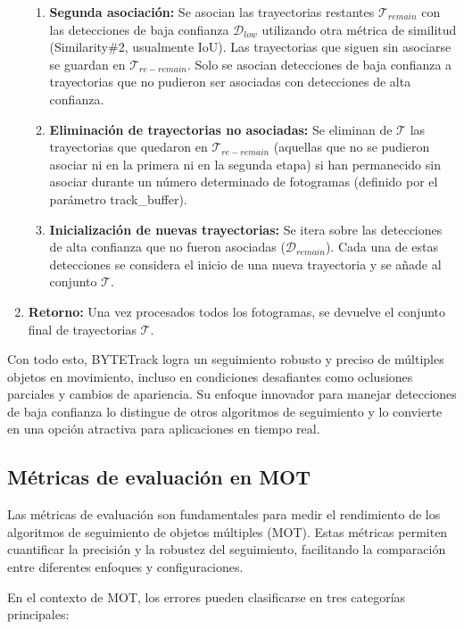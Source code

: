 \documentclass[11pt,spanish,listoffigures,listoftables]{tfgetsinf}
\begin{document}
\begin{enumerate}
{\begin{enumerate}
      \item \textbf{Segunda asociación:} Se asocian las trayectorias restantes $\mathcal{T}_{remain}$ con las detecciones de baja confianza $\mathcal{D}_{low}$ utilizando otra métrica de similitud (Similarity\#2, usualmente IoU). Las trayectorias que siguen sin asociarse se guardan en $\mathcal{T}_{re-remain}$. Solo se asocian detecciones de baja confianza a trayectorias que no pudieron ser asociadas con detecciones de alta confianza.
      \item \textbf{Eliminación de trayectorias no asociadas:} Se eliminan de $\mathcal{T}$ las trayectorias que quedaron en $\mathcal{T}_{re-remain}$ (aquellas que no se pudieron asociar ni en la primera ni en la segunda etapa) si han permanecido sin asociar durante un número determinado de fotogramas (definido por el parámetro track\_buffer).
      \item \textbf{Inicialización de nuevas trayectorias:} Se itera sobre las detecciones de alta confianza que no fueron asociadas ($\mathcal{D}_{remain}$). Cada una de estas detecciones se considera el inicio de una nueva trayectoria y se añade al conjunto $\mathcal{T}$.
   \end{enumerate}
   } %
   \item \textbf{Retorno:} Una vez procesados todos los fotogramas, se devuelve el conjunto final de trayectorias $\mathcal{T}$.
\end{enumerate}


Con todo esto, BYTETrack logra un seguimiento robusto y preciso de múltiples objetos en movimiento, incluso en condiciones desafiantes como oclusiones parciales y cambios de apariencia. Su enfoque innovador para manejar detecciones de baja confianza lo distingue de otros algoritmos de seguimiento y lo convierte en una opción atractiva para aplicaciones en tiempo real.


\subsection{Métricas de evaluación en MOT} \label{sec:metricas_mot}

Las métricas de evaluación son fundamentales para medir el rendimiento de los algoritmos de seguimiento de objetos múltiples (MOT). Estas métricas permiten cuantificar la precisión y la robustez del seguimiento, facilitando la comparación entre diferentes enfoques y configuraciones.

En el contexto de MOT, los errores pueden clasificarse en tres categorías principales:
\end{document}
